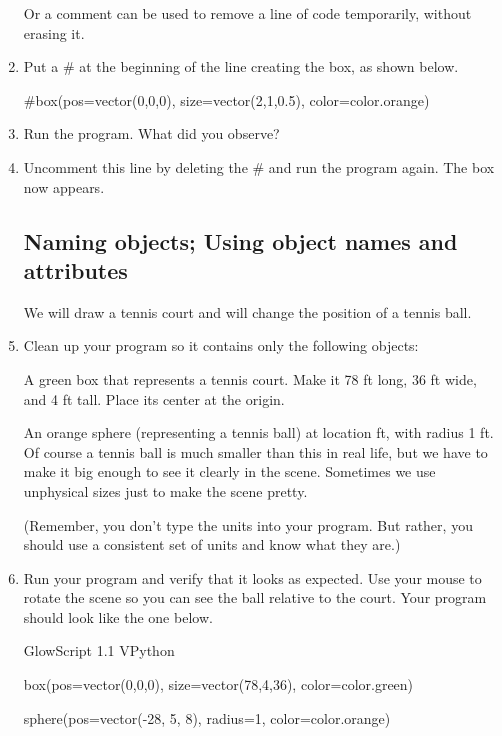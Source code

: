 \begin{enumerate}
Or a comment can be used to remove a line of code temporarily, without erasing it.

	\item Put a \# at the beginning of the line creating the box, as shown below.

\begin{myvpython}
#box(pos=vector(0,0,0), size=vector(2,1,0.5), color=color.orange)
\end{myvpython}

	\item Run the program. What did you observe?
	
	\item Uncomment this line by deleting the \# and run the program again. The box now appears.
	
	\subsection*{Naming objects; Using object names and attributes}
	
We will draw a tennis court and will change the position of a tennis ball.

	\item Clean up your program so it contains only the following objects:  

A green box that represents a tennis court. Make it 78 ft long, 36 ft wide, and 4 ft tall. Place its center at the origin.

An orange sphere (representing a tennis ball) at location  ft, with radius 1 ft. Of course a tennis ball is much smaller than this in real life, but we have to make it big enough to see it clearly in the scene. Sometimes we use unphysical sizes just to make the scene pretty.

(Remember, you don't type the units into your program. But rather, you should use a consistent set of units and know what they are.)

	\item Run your program and verify that it looks as expected. Use your mouse to rotate the scene so you can see the ball relative to the court. Your program should look like the one below.
	
\begin{vpythonprogram}
GlowScript 1.1 VPython

box(pos=vector(0,0,0), size=vector(78,4,36), color=color.green)

sphere(pos=vector(-28, 5, 8), radius=1, color=color.orange)


\end{vpythonprogram}
\end{enumerate}
